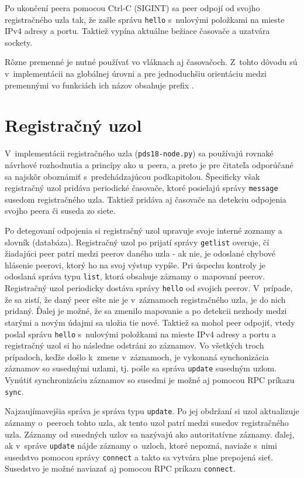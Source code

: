 Po ukončení peera pomocou Ctrl-C (SIGINT) sa peer odpojí od svojho registračného uzla tak, že zašle správu \texttt{hello} s~nulovými položkami na mieste IPv4 adresy a portu. Taktiež vypína aktuálne bežiace časovače a uzatvára sockety.

Rôzne premenné je nutné používať vo vláknach aj časovačoch. Z~tohto dôvodu sú v~implementácii na globálnej úrovni a pre jednoduchšiu orientáciu medzi premennými vo funkciách ich názov obsahuje prefix .


\section{Registračný uzol}

V~implementácii registračného uzla (\texttt{pds18-node.py}) sa používajú rovnaké návrhové rozhodnutia a princípy ako u~peera, a preto je pre čitateľa odporúčané sa najskôr oboznámiť s~predchádzajúcou podkapitolou. Špecificky však registračný uzol pridáva periodické časovače, ktoré posielajú správy \texttt{message} susedom registračného uzla. Taktiež pridáva aj časovače na detekciu odpojenia svojho peera či suseda zo siete. 

Po detegovaní odpojenia si registračný uzol upravuje svoje interné zoznamy a slovník (databáza). Registračný uzol po prijatí správy \texttt{getlist} overuje, čí žiadajúci peer patrí medzi peerov daného uzla \-- ak nie, je odoslané chybové hlásenie peerovi, ktorý ho na svoj výstup vypíše. Pri úspechu kontroly je odoslaná správa typu \texttt{list}, ktorá obsahuje záznamy o~mapovaní peerov. Registračný uzol periodicky dostáva správy \texttt{hello} od svojich peerov. V~prípade, že sa zistí, že daný peer ešte nie je v~záznamoch registračného uzla, je do nich pridaný. Ďalej je možné, že sa zmenilo mapovanie a po detekcii nezhody medzi starými a novým údajmi sa uložia tie nové. Taktiež sa mohol peer odpojiť, vtedy poslal správu \texttt{hello} s~nulovými položkami na mieste IPv4 adresy a portu a registračný uzol si ho následne odstráni zo záznamov. Vo všetkých troch prípadoch, keďže došlo k~zmene v~záznamoch, je vykonaná synchonizácia záznamov so susednými uzlami, tj. pošle sa správa  \texttt{update} susedným uzlom. Vynútiť synchronizáciu záznamov so susedmi je možné aj pomocou RPC príkazu \texttt{sync}. 

Najzaujímavejšia správa je správa typu \texttt{update}. Po jej obdržaní si uzol aktualizuje záznamy o~peeroch tohto uzla, ak tento uzol patrí medzi susedov registračného uzla. Záznamy od susedných uzlov sa nazývajú ako autoritatívne záznamy. ďalej, ak v~správe \texttt{update} nájde záznamy o~uzloch, ktoré nepozná, naviaže s~nimi susedstvo pomocou správy \texttt{connect} a takto sa vytvára plne prepojená  sieť. Susedstvo je možné naviazať aj pomocou RPC príkazu \texttt{connect}.

